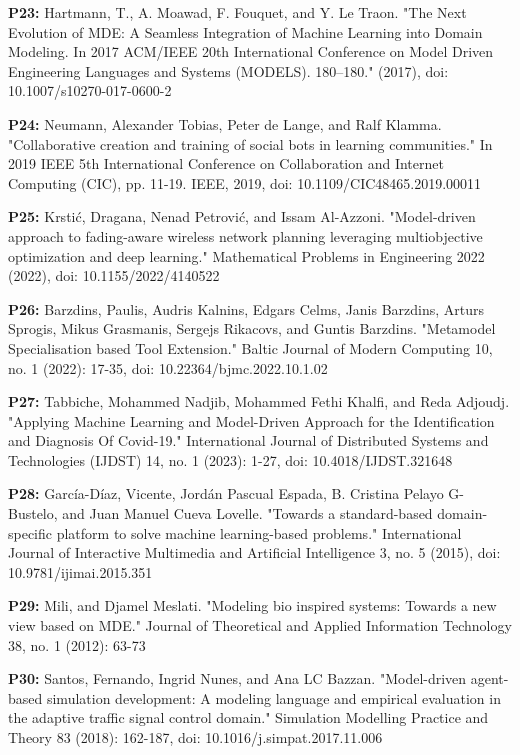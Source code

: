 \begin{footnotesize}
\textbf{P23: } Hartmann, T., A. Moawad, F. Fouquet, and Y. Le Traon. "The Next Evolution of MDE: A Seamless Integration of Machine Learning into Domain Modeling. In 2017 ACM/IEEE 20th International Conference on Model Driven Engineering Languages and Systems (MODELS). 180–180." (2017), doi: 10.1007/s10270-017-0600-2

\textbf{P24: } Neumann, Alexander Tobias, Peter de Lange, and Ralf Klamma. "Collaborative creation and training of social bots in learning communities." In 2019 IEEE 5th International Conference on Collaboration and Internet Computing (CIC), pp. 11-19. IEEE, 2019, doi: 10.1109/CIC48465.2019.00011

\textbf{P25: } Krstić, Dragana, Nenad Petrović, and Issam Al-Azzoni. "Model-driven approach to fading-aware wireless network planning leveraging multiobjective optimization and deep learning." Mathematical Problems in Engineering 2022 (2022), doi: 10.1155/2022/4140522

\textbf{P26: } Barzdins, Paulis, Audris Kalnins, Edgars Celms, Janis Barzdins, Arturs Sprogis, Mikus Grasmanis, Sergejs Rikacovs, and Guntis Barzdins. "Metamodel Specialisation based Tool Extension." Baltic Journal of Modern Computing 10, no. 1 (2022): 17-35, doi: 10.22364/bjmc.2022.10.1.02

\textbf{P27: } Tabbiche, Mohammed Nadjib, Mohammed Fethi Khalfi, and Reda Adjoudj. "Applying Machine Learning and Model-Driven Approach for the Identification and Diagnosis Of Covid-19." International Journal of Distributed Systems and Technologies (IJDST) 14, no. 1 (2023): 1-27, doi: 10.4018/IJDST.321648

\textbf{P28: } García-Díaz, Vicente, Jordán Pascual Espada, B. Cristina Pelayo G-Bustelo, and Juan Manuel Cueva Lovelle. "Towards a standard-based domain-specific platform to solve machine learning-based problems." International Journal of Interactive Multimedia and Artificial Intelligence 3, no. 5 (2015), doi:  10.9781/ijimai.2015.351 

\textbf{P29: } Mili, and Djamel Meslati. "Modeling bio inspired systems: Towards a new view based on MDE." Journal of Theoretical and Applied Information Technology 38, no. 1 (2012): 63-73

\textbf{P30: } Santos, Fernando, Ingrid Nunes, and Ana LC Bazzan. "Model-driven agent-based simulation development: A modeling language and empirical evaluation in the adaptive traffic signal control domain." Simulation Modelling Practice and Theory 83 (2018): 162-187, doi: 10.1016/j.simpat.2017.11.006


\end{footnotesize}
